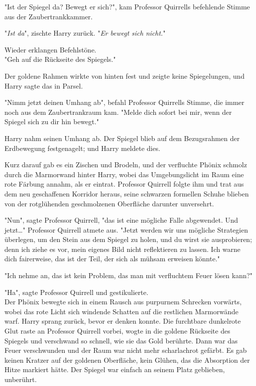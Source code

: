 {"Ist der Spiegel da? Bewegt er sich?", kam Professor Quirrells befehlende Stimme aus der Zaubertrankkammer.

"\emph{Ist da}", zischte Harry zurück. "\emph{Er bewegt sich nicht.}"

Wieder erklangen Befehlstöne.\\ "Geh auf die Rückseite des Spiegels."

Der goldene Rahmen wirkte von hinten fest und zeigte keine Spiegelungen, und Harry sagte das in Parsel.

"Nimm jetzt deinen Umhang ab", befahl Professor Quirrells Stimme, die immer noch aus dem Zaubertrankraum kam. "Melde dich sofort bei mir, wenn der Spiegel sich zu dir hin bewegt."

Harry nahm seinen Umhang ab. Der Spiegel blieb auf dem Bezugsrahmen der Erdbewegung festgenagelt; und Harry meldete dies.

Kurz darauf gab es ein Zischen und Brodeln, und der verfluchte Phönix schmolz durch die Marmorwand hinter Harry, wobei das Umgebungslicht im Raum eine rote Färbung annahm, als er eintrat. Professor Quirrell folgte ihm und trat aus dem neu geschaffenen Korridor heraus, seine schwarzen formellen Schuhe blieben von der rotglühenden geschmolzenen Oberfläche darunter unversehrt.

"Nun", sagte Professor Quirrell, "das ist eine mögliche Falle abgewendet. Und jetzt…" Professor Quirrell atmete aus. "Jetzt werden wir uns mögliche Strategien überlegen, um den Stein aus dem Spiegel zu holen, und du wirst sie ausprobieren; denn ich ziehe es vor, mein eigenes Bild nicht reflektieren zu lassen. Ich warne dich fairerweise, das ist der Teil, der sich als mühsam erweisen könnte."

"Ich nehme an, das ist kein Problem, das man mit verfluchtem Feuer lösen kann?"

"Ha", sagte Professor Quirrell und gestikulierte.\\ Der Phönix bewegte sich in einem Rausch aus purpurnem Schrecken vorwärts, wobei das rote Licht sich windende Schatten auf die restlichen Marmorwände warf. Harry sprang zurück, bevor er denken konnte. Die furchtbare dunkelrote Glut raste an Professor Quirrell vorbei, wogte in die goldene Rückseite des Spiegels und verschwand so schnell, wie sie das Gold berührte. Dann war das Feuer verschwunden und der Raum war nicht mehr scharlachrot gefärbt. Es gab keinen Kratzer auf der goldenen Oberfläche, kein Glühen, das die Absorption der Hitze markiert hätte. Der Spiegel war einfach an seinem Platz geblieben, unberührt.

}
